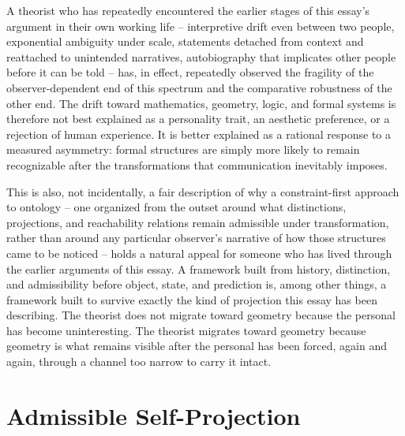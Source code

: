 \documentclass[11pt]{article}
\theoremstyle{plain}
\begin{document}
A theorist who has repeatedly encountered the earlier stages of this essay's argument in their own working life -- interpretive drift even between two people, exponential ambiguity under scale, statements detached from context and reattached to unintended narratives, autobiography that implicates other people before it can be told -- has, in effect, repeatedly observed the fragility of the observer-dependent end of this spectrum and the comparative robustness of the other end. The drift toward mathematics, geometry, logic, and formal systems is therefore not best explained as a personality trait, an aesthetic preference, or a rejection of human experience. It is better explained as a rational response to a measured asymmetry: formal structures are simply more likely to remain recognizable after the transformations that communication inevitably imposes.

This is also, not incidentally, a fair description of why a constraint-first approach to ontology -- one organized from the outset around what distinctions, projections, and reachability relations remain admissible under transformation, rather than around any particular observer's narrative of how those structures came to be noticed -- holds a natural appeal for someone who has lived through the earlier arguments of this essay. A framework built from history, distinction, and admissibility before object, state, and prediction is, among other things, a framework built to survive exactly the kind of projection this essay has been describing. The theorist does not migrate toward geometry because the personal has become uninteresting. The theorist migrates toward geometry because geometry is what remains visible after the personal has been forced, again and again, through a channel too narrow to carry it intact.

\section{Admissible Self-Projection}
\end{document}
